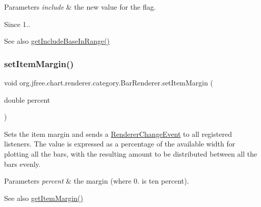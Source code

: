 \begin{DoxyParams}{Parameters}
{\em include} & the new value for the flag.\\
\hline
\end{DoxyParams}
\begin{DoxySince}{Since}
1..
\end{DoxySince}
\begin{DoxySeeAlso}{See also}
\mbox{\hyperlink{classorg_1_1jfree_1_1chart_1_1renderer_1_1category_1_1_bar_renderer_a2a651216a3c24be67f109d7bb02c3a7c}{get\+Include\+Base\+In\+Range()}} 
\end{DoxySeeAlso}
\mbox{\label{classorg_1_1jfree_1_1chart_1_1renderer_1_1category_1_1_bar_renderer_aa1a02fa837f9a309c0cc4f94683d4104}} 
\subsubsection{\texorpdfstring{set\+Item\+Margin()}{setItemMargin()}}
{\footnotesize\ttfamily void org.\+jfree.\+chart.\+renderer.\+category.\+Bar\+Renderer.\+set\+Item\+Margin (\begin{DoxyParamCaption}\item[{double}]{percent }\end{DoxyParamCaption})}

Sets the item margin and sends a \mbox{\hyperlink{}{Renderer\+Change\+Event}} to all registered listeners. The value is expressed as a percentage of the available width for plotting all the bars, with the resulting amount to be distributed between all the bars evenly.


\begin{DoxyParams}{Parameters}
{\em percent} & the margin (where 0. is ten percent).\\
\hline
\end{DoxyParams}
\begin{DoxySeeAlso}{See also}
\mbox{\hyperlink{classorg_1_1jfree_1_1chart_1_1renderer_1_1category_1_1_bar_renderer_aea515b299aef9bd050aa0a633abd25aa}{get\+Item\+Margin()}} 
\end{DoxySeeAlso}
\mbox{\label{classorg_1_1jfree_1_1chart_1_1renderer_1_1category_1_1_bar_renderer_a125a31aa3e88e6ab0e63e0efa245994f}} 
